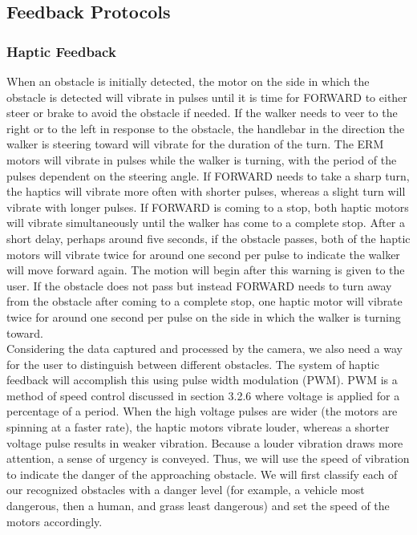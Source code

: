 \subsection{Feedback Protocols}

\subsubsection{Haptic Feedback}
\noindent When an obstacle is initially detected, the motor on the side in which the obstacle is detected will vibrate in pulses until it is time for FORWARD to either steer or brake to avoid the obstacle if needed. If the walker needs to veer to the right or to the left in response to the obstacle, the handlebar in the direction the walker is steering toward will vibrate for the duration of the turn. The ERM motors will vibrate in pulses while the walker is turning, with the period of the pulses dependent on the steering angle. If FORWARD needs to take a sharp turn, the haptics will vibrate more often with shorter pulses, whereas a slight turn will vibrate with longer pulses. If FORWARD is coming to a stop, both haptic motors will vibrate simultaneously until the walker has come to a complete stop. After a short delay, perhaps around five seconds, if the obstacle passes, both of the haptic motors will vibrate twice for around one second per pulse to indicate the walker will move forward again. The motion will begin after this warning is given to the user. If the obstacle does not pass but instead FORWARD needs to turn away from the obstacle after coming to a complete stop, one haptic motor will vibrate twice for around one second per pulse on the side in which the walker is turning toward.\\ 

\noindent Considering the data captured and processed by the camera, we also need a way for the user to distinguish between different obstacles. The system of haptic feedback will accomplish this using pulse width modulation (PWM). PWM is a method of speed control discussed in section 3.2.6 where voltage is applied for a percentage of a period. When the high voltage pulses are wider (the motors are spinning at a faster rate), the haptic motors vibrate louder, whereas a shorter voltage pulse results in weaker vibration. Because a louder vibration draws more attention, a sense of urgency is conveyed. Thus, we will use the speed of vibration to indicate the danger of the approaching obstacle. We will first classify each of our recognized obstacles with a danger level (for example, a vehicle most dangerous, then a human, and grass least dangerous) and set the speed of the motors accordingly.\\

